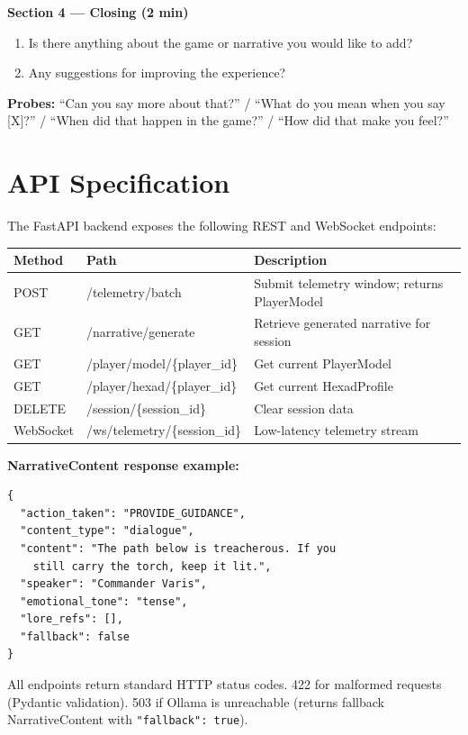 \documentclass[12pt,a4paper]{report}
\begin{document}
\textbf{Section 4 --- Closing (2 min)}
\begin{enumerate}[resume]
\item Is there anything about the game or narrative you would like to add?
\item Any suggestions for improving the experience?
\end{enumerate}

\textbf{Probes:} ``Can you say more about that?'' / ``What do you mean when you say [X]?'' / ``When did that happen in the game?'' / ``How did that make you feel?''


\chapter{API Specification}
\label{app:api}

The FastAPI backend exposes the following REST and WebSocket endpoints:

\begin{table}[H]
\centering
\small
\begin{tabular}{@{}llp{6cm}@{}}
\toprule
\textbf{Method} & \textbf{Path} & \textbf{Description} \\
\midrule
POST & /telemetry/batch & Submit telemetry window; returns PlayerModel \\
GET & /narrative/generate & Retrieve generated narrative for session \\
GET & /player/model/\{player\_id\} & Get current PlayerModel \\
GET & /player/hexad/\{player\_id\} & Get current HexadProfile \\
DELETE & /session/\{session\_id\} & Clear session data \\
WebSocket & /ws/telemetry/\{session\_id\} & Low-latency telemetry stream \\
\bottomrule
\end{tabular}
\end{table}

\textbf{NarrativeContent response example:}

\begin{lstlisting}[language={}]
{
  "action_taken": "PROVIDE_GUIDANCE",
  "content_type": "dialogue",
  "content": "The path below is treacherous. If you
    still carry the torch, keep it lit.",
  "speaker": "Commander Varis",
  "emotional_tone": "tense",
  "lore_refs": [],
  "fallback": false
}
\end{lstlisting}

All endpoints return standard HTTP status codes. 422 for malformed requests (Pydantic validation). 503 if Ollama is unreachable (returns fallback NarrativeContent with \texttt{"fallback": true}).
\end{document}
